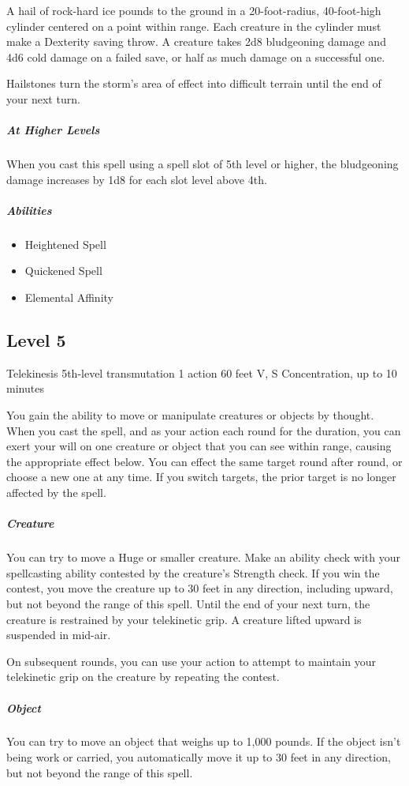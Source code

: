 \documentclass[letterpaper,openany,oneside,twocolumn]{book}
\begin{document}
A hail of rock-hard ice pounds to the ground in a 20-foot-radius, 40-foot-high cylinder centered on a point within range.  Each creature in the cylinder must make a Dexterity saving throw. A creature takes 2d8 bludgeoning damage and 4d6 cold damage on a failed save, or half as much damage on a successful one.

Hailstones turn the storm's area of effect into difficult terrain until the end  of your next turn.

\subparagraph*{At Higher Levels} When you cast this spell using a spell slot of 5th level or higher, the bludgeoning damage increases by 1d8 for each slot level above 4th.

\subparagraph*{Abilities}
\begin{itemize}
  \item Heightened Spell
  \item Quickened Spell
  \item Elemental Affinity
\end{itemize}


\subsection*{Level 5}

\DndSpellHeader
  {Telekinesis}
  {5th-level transmutation}
  {1 action}
  {60 feet}
  {V, S}
  {Concentration, up to 10 minutes}

You gain the ability to move or manipulate creatures or objects by thought. When you cast the spell, and as your action each round for the duration, you can exert your will on one creature or object that you can see within range, causing the appropriate effect below. You can effect the same target round after round, or choose a new one at any time. If you switch targets, the prior target is no longer affected by the spell.

\subparagraph*{Creature} You can try to move a Huge or smaller creature. Make an ability check with your spellcasting ability contested by the creature's Strength check. If you win the contest, you move the creature up to 30 feet in any direction, including upward, but not beyond the range of this spell. Until the end of your next turn, the creature is restrained by your telekinetic grip. A creature lifted upward is suspended in mid-air.

On subsequent rounds, you can use your action to attempt to maintain your telekinetic grip on the creature by repeating the contest.

\subparagraph*{Object} You can try to move an object that weighs up to 1,000 pounds. If the object isn't being work or carried, you automatically move it up to 30 feet in any direction, but not beyond the range of this spell.
\end{document}
